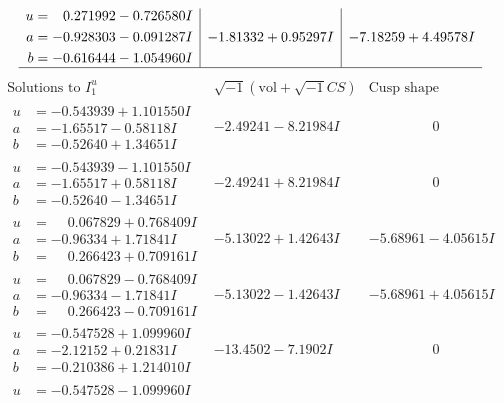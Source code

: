 \documentclass[1p]{elsarticle_modified}
\theoremstyle{definition}
\newcommand{\I}{\sqrt{-1}}
\begin{document}
$$\begin{array}{c|c|c}
\begin{aligned}
u &= \phantom{-}0.271992 - 0.726580 I \\
a &= -0.928303 - 0.091287 I \\
b &= -0.616444 - 1.054960 I\end{aligned}
 & -1.81332 + 0.95297 I & -7.18259 + 4.49578 I\\
 \hline 
 \end{array}$$\newpage$$\begin{array}{c|c|c}  
\text{Solutions to }I^u_{1}& \I (\text{vol} + \sqrt{-1}CS) & \text{Cusp shape}\\
 \hline 
\begin{aligned}
u &= -0.543939 + 1.101550 I \\
a &= -1.65517 - 0.58118 I \\
b &= -0.52640 + 1.34651 I\end{aligned}
 & -2.49241 - 8.21984 I & \phantom{-0.000000 } 0 \\ \hline\begin{aligned}
u &= -0.543939 - 1.101550 I \\
a &= -1.65517 + 0.58118 I \\
b &= -0.52640 - 1.34651 I\end{aligned}
 & -2.49241 + 8.21984 I & \phantom{-0.000000 } 0 \\ \hline\begin{aligned}
u &= \phantom{-}0.067829 + 0.768409 I \\
a &= -0.96334 + 1.71841 I \\
b &= \phantom{-}0.266423 + 0.709161 I\end{aligned}
 & -5.13022 + 1.42643 I & -5.68961 - 4.05615 I \\ \hline\begin{aligned}
u &= \phantom{-}0.067829 - 0.768409 I \\
a &= -0.96334 - 1.71841 I \\
b &= \phantom{-}0.266423 - 0.709161 I\end{aligned}
 & -5.13022 - 1.42643 I & -5.68961 + 4.05615 I \\ \hline\begin{aligned}
u &= -0.547528 + 1.099960 I \\
a &= -2.12152 + 0.21831 I \\
b &= -0.210386 + 1.214010 I\end{aligned}
 & -13.4502 - 7.1902 I & \phantom{-0.000000 } 0 \\ \hline\begin{aligned}
u &= -0.547528 - 1.099960 I \\

\end{aligned}
\end{array}$$
\end{document}
